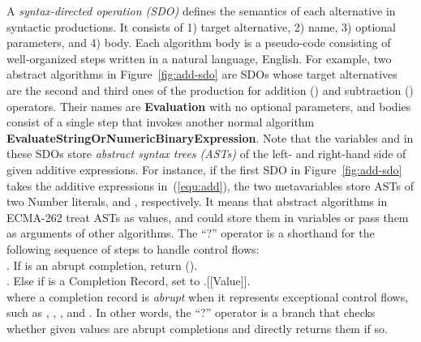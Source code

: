 
A \textit{syntax-directed operation (SDO)} defines the semantics of each
alternative in syntactic productions.
%
It consists of 1) target alternative, 2) name, 3) optional parameters, and 4)
body.
%
Each algorithm body is a pseudo-code consisting of well-organized steps written
in a natural language, English.
%
For example, two abstract algorithms in Figure~\ref{fig:add-sdo} are SDOs whose
target alternatives are the second and third ones of the
 production for addition (\scode{+}) and subtraction
(\scode{-}) operators.
%
Their names are \textbf{Evaluation} with no optional parameters, and
bodies consist of a single step that invokes another normal algorithm
\textbf{EvaluateStringOrNumericBinaryExpression}.
%
Note that the variables  and
 in these SDOs store \textit{abstract syntax
trees (ASTs)} of the left- and right-hand side of given additive expressions.
%
For instance, if the first SDO in Figure~\ref{fig:add-sdo} takes the additive
expressions in~(\ref{equ:add}), the two metavariables store ASTs of two Number
literals,  and , respectively.
%
It means that abstract algorithms in ECMA-262 treat ASTs as values, and could
store them in variables or pass them as arguments of other algorithms.
%
The ``?'' operator is a shorthand for the following sequence of steps to handle
control flows:
\vspace*{.5em}\\
{
  \noindent
  \null{}. If  is an abrupt completion, return
  ().
  \\
  \null{}. Else if  is a Completion Record, set
   to .[[Value]].
}
\vspace*{.5em}\\
where a completion record is \textit{abrupt} when it represents exceptional
control flows, such as , , , and
.
%
In other words, the ``?'' operator is a branch that checks whether given
values are abrupt completions and directly returns them if so.


